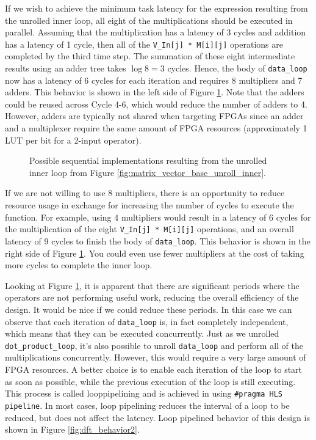 If we wish to achieve the minimum task latency for the expression resulting from the unrolled inner loop, all eight of the multiplications should be executed in parallel. Assuming that the multiplication has a latency of 3 cycles and addition has a latency of 1 cycle, then all of the \lstinline|V_In[j] * M[i][j]| operations are completed by the third time step. The summation of these eight intermediate results using an adder tree takes $\log 8 = 3$ cycles. Hence, the body of \lstinline|data_loop| now has a latency of 6 cycles for each iteration and requires 8 multipliers and 7 adders.  This behavior is shown in the left side of  Figure \ref{fig:dft_behavior1}.  Note that the adders could be reused across Cycle 4-6, which would reduce the number of adders to 4. However, adders are typically not shared when targeting FPGAs since an adder and a multiplexer require the same amount of FPGA resources (approximately 1 LUT per bit for a 2-input operator). 

\begin{figure}
\centering

%
\caption{Possible sequential implementations resulting from the unrolled inner loop from Figure \ref{fig:matrix_vector_base_unroll_inner}.}\label{fig:dft_behavior1}
\end{figure}

If we are not willing to use 8 multipliers, there is an opportunity to reduce resource usage in exchange for increasing the number of cycles to execute the function. For example, using 4 multipliers would result in a latency of 6 cycles for the multiplication of the eight \lstinline|V_In[j] * M[i][j]| operations, and an overall latency of 9 cycles to finish the body of \lstinline|data_loop|. This behavior is shown in the right side of Figure \ref{fig:dft_behavior1}.  You could even use fewer multipliers at the cost of taking more cycles to complete the inner loop.

Looking at Figure \ref{fig:dft_behavior1}, it is apparent that there are significant periods where the operators are not performing useful work, reducing the overall efficiency of the design.  It would be nice if we could reduce these periods.  In this case we can observe that each iteration of \lstinline|data_loop| is, in fact completely independent, which means that they can be executed concurrently.  Just as we unrolled \lstinline{dot_product_loop}, it's also possible to unroll \lstinline{data_loop} and perform all of the multiplications concurrently.  However, this would require a very large amount of FPGA resources.  A better choice is to enable each iteration of the loop to start as soon as possible, while the previous execution of the loop is still executing.  This process is called \gls{looppipelining} and is achieved in \VHLS using \lstinline|#pragma HLS pipeline|.  In most cases, loop pipelining reduces the interval of a loop to be reduced, but does not affect the latency.  Loop pipelined behavior of this design is shown in Figure \ref{fig:dft_behavior2}. 

